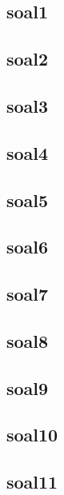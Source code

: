 \documentclass[a4paper,12pt]{report}
\begin{document}
\subsection*{soal1}

\subsection*{soal2}

\subsection*{soal3}

\subsection*{soal4}

\subsection*{soal5}

\subsection*{soal6}

\subsection*{soal7}

\subsection*{soal8}

\subsection*{soal9}

\subsection*{soal10}

\subsection*{soal11}

\end{document}
